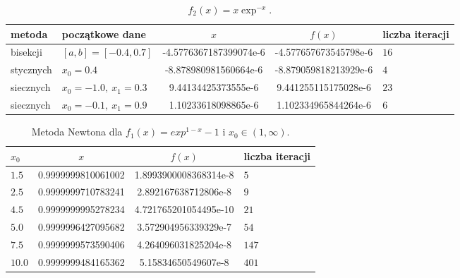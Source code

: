 \documentclass{classrep}
\begin{document}
		\begin{table}[!hpbt]
        		\centering
        		\footnotesize
			\begin{tabular}{llSSl} \toprule
				{metoda} & {początkowe dane} &{$x$} & {$f(x)$} & {liczba iteracji}\\ \midrule
				bisekcji & $[a,b]=[-0.4,0.7]$ & -4.5776367187399074e-6 & -4.577657673545798e-6 & $16$ \\ 
	 			stycznych & $x_0=0.4$ & -8.878980981560664e-6 & -8.879059818213929e-6 & $4$ \\  	
	 			siecznych & $x_0=-1.0,~x_1=0.3$ & 9.44134425373555e-6 & 9.441255115175028e-6 & $23$ \\
	 			siecznych & $x_0=-0.1,~x_1=0.9$ & 1.10233618098865e-6 & 1.102334965844264e-6 & $6$ \\ \bottomrule
	 		\end{tabular}
	 		\caption{$f_2(x)=x\exp^{-x}$.}
			\label{table:4}			
		\end{table}	
		
		\begin{table}[!hpbt]
        		\centering
        		\footnotesize
			\begin{tabular}{lSSl} \toprule
				{$x_0$} & {$x$} & {$f(x)$} & {liczba iteracji}\\ \midrule
				$1.5$ & 0.9999999810061002 & 1.8993900008368314e-8 & $5$ \\ 
				$2.5$ & 0.9999999710783241 & 2.892167638712806e-8 & $9$ \\
	 			$4.5$ & 0.9999999995278234 & 4.721765201054495e-10 & $21$ \\
	 			$5.0$ & 0.9999996427095682 & 3.572904956339329e-7 & $54$ \\
	 			$7.5$ & 0.9999999573590406 & 4.264096031825204e-8 & $147$ \\
	 			$10.0$ & 0.9999999484165362 & 5.15834650549607e-8 & $401$ \\ \bottomrule
	 		\end{tabular}
	 		\caption{Metoda Newtona dla $f_1(x)=exp^{1-x}-1$ i $x_0\in{(1,\infty)}$.}
			\label{table:5}			
		\end{table}	
		
\end{document}

